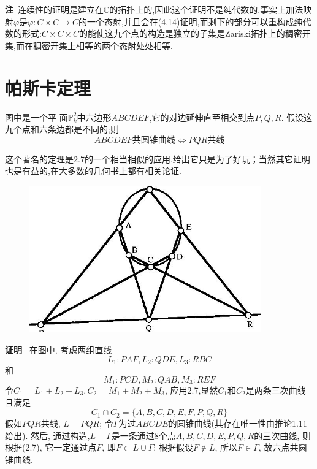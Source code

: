 \documentclass[UTF8]{book}
\begin{document}
		
		\textbf{注}\ 连续性的证明是建立在$ \mathbb{C} $的拓扑上的,因此这个证明不是纯代数的.事实上加法映射$ \varphi $是$\varphi: C \times C \rightarrow C$的一个态射,并且会在(4.14)证明,而剩下的部分可以重构成纯代数的形式:$ C \times C \times C $的能使这九个点的构造是独立的子集是Zariski拓扑上的稠密开集,而在稠密开集上相等的两个态射处处相等.
	\section{帕斯卡定理}
			图中是一个平	面$\mathbb{P}^{2}_{k}$中六边形$ ABCDEF $,它的对边延伸直至相交到点$ P,Q,R $. 假设这九个点和六条边都是不同的;则
			\begin{equation*}
				ABCDEF\text{共圆锥曲线} \Longleftrightarrow PQR\text{共线}
			\end{equation*}
		
			这个著名的定理是2.7的一个相当相似的应用,给出它只是为了好玩；当然其它证明也是有益的,在大多数的几何书上都有相关论证.
			\begin{figure}[h]
			  \centering
			  \includegraphics[width=10cm]{37.jpg}\\
			\end{figure}
		
		
			\textbf{证明} \ 在图中, 考虑两组直线
			\begin{equation*}
				L_{1}:PAF, L_{2}:QDE, L_{3}:RBC	
			\end{equation*}
			和
			\begin{equation*}
				M_{1}:PCD, M_{2}:QAB, M_{3}:REF	
			\end{equation*}
			令$C_{1}=L_{1}+L_{2}+L_{3},C_{2}=M_{1}+M_{2}+M_{3}$, 应用2.7,显然$C_{1}$和$C_{2}$是两条三次曲线且满足
			\begin{equation*}
			C_{1} \cap C_{2}=\{A,B,C,D,E,F,P,Q,R\}
			\end{equation*}
			假如$ PQR $共线, $ L=PQR $; 令$\Gamma$为过$ ABCDE $的圆锥曲线(其存在唯一性由推论1.11给出). 然后, 通过构造,$L+\Gamma$是一条通过8个点$ A,B,C,D,E,P,Q,R $的三次曲线, 则根据(2.7), 它一定通过点$ F $, 即$F \subset L \cup \Gamma$; 根据假设$F \notin L$, 所以$F \in \Gamma$, 故六点共圆锥曲线.
		
\end{document}
